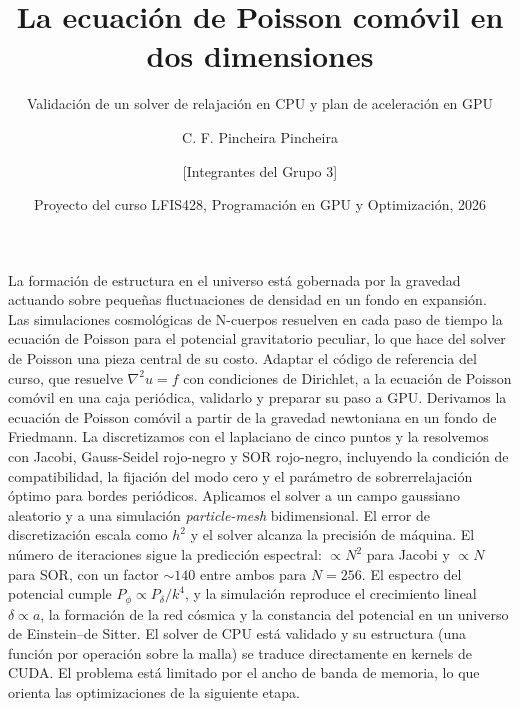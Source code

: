 \documentclass{aa}
\begin{document}
\nolinenumbers
\renewcommand{\figurename}{Fig.}
\renewcommand{\tablename}{Tabla}
\renewcommand{\refname}{Referencias}

   \title{La ecuación de Poisson comóvil en dos dimensiones}
   \subtitle{Validación de un solver de relajación en CPU y plan de aceleración en GPU}

   \author{C. F. Pincheira Pincheira
        \and [Integrantes del Grupo 3]
        }


   \date{Proyecto del curso LFIS428, Programación en GPU y Optimización, 2026}

  \abstract
   {La formación de estructura en el universo está gobernada por la gravedad actuando sobre pequeñas fluctuaciones de densidad en un fondo en expansión. Las simulaciones cosmológicas de N-cuerpos resuelven en cada paso de tiempo la ecuación de Poisson para el potencial gravitatorio peculiar, lo que hace del solver de Poisson una pieza central de su costo.}
   {Adaptar el código de referencia del curso, que resuelve $\nabla^2u=f$ con condiciones de Dirichlet, a la ecuación de Poisson comóvil en una caja periódica, validarlo y preparar su paso a GPU.}
   {Derivamos la ecuación de Poisson comóvil a partir de la gravedad newtoniana en un fondo de Friedmann. La discretizamos con el laplaciano de cinco puntos y la resolvemos con Jacobi, Gauss-Seidel rojo-negro y SOR rojo-negro, incluyendo la condición de compatibilidad, la fijación del modo cero y el parámetro de sobrerrelajación óptimo para bordes periódicos. Aplicamos el solver a un campo gaussiano aleatorio y a una simulación \emph{particle-mesh} bidimensional.}
   {El error de discretización escala como $h^2$ y el solver alcanza la precisión de máquina. El número de iteraciones sigue la predicción espectral: $\propto N^2$ para Jacobi y $\propto N$ para SOR, con un factor $\sim140$ entre ambos para $N=256$. El espectro del potencial cumple $P_\phi\propto P_\delta/k^4$, y la simulación reproduce el crecimiento lineal $\delta\propto a$, la formación de la red cósmica y la constancia del potencial en un universo de Einstein--de Sitter.}
   {El solver de CPU está validado y su estructura (una función por operación sobre la malla) se traduce directamente en kernels de CUDA. El problema está limitado por el ancho de banda de memoria, lo que orienta las optimizaciones de la siguiente etapa.}
\end{document}
